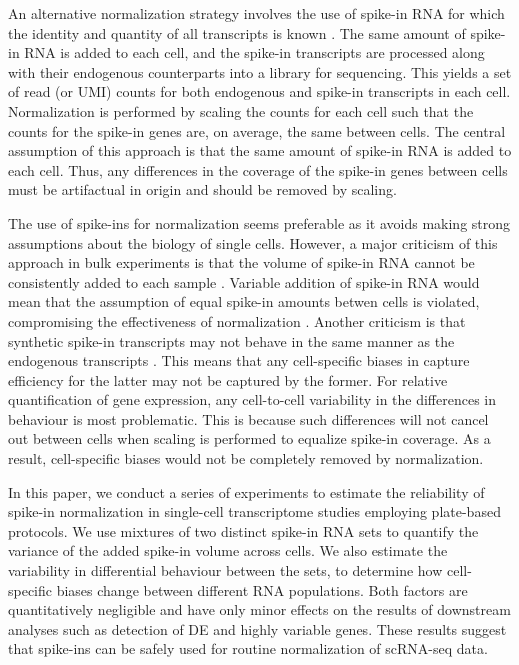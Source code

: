 \documentclass{article}
\begin{document}
An alternative normalization strategy involves the use of spike-in RNA for which the identity and quantity of all transcripts is known \cite{stegle2015computational}.
The same amount of spike-in RNA is added to each cell, and the spike-in transcripts are processed along with their endogenous counterparts into a library for sequencing.
This yields a set of read (or UMI) counts for both endogenous and spike-in transcripts in each cell.
Normalization is performed by scaling the counts for each cell such that the counts for the spike-in genes are, on average, the same between cells.
The central assumption of this approach is that the same amount of spike-in RNA is added to each cell.
Thus, any differences in the coverage of the spike-in genes between cells must be artifactual in origin and should be removed by scaling.

The use of spike-ins for normalization seems preferable as it avoids making strong assumptions about the biology of single cells.
However, a major criticism of this approach in bulk experiments is that the volume of spike-in RNA cannot be consistently added to each sample \cite{robinson2010tmm}.
Variable addition of spike-in RNA would mean that the assumption of equal spike-in amounts betwen cells is violated, compromising the effectiveness of normalization \cite{risso2014normalization}.
Another criticism is that synthetic spike-in transcripts may not behave in the same manner as the endogenous transcripts \cite{grun2015design}.
This means that any cell-specific biases in capture efficiency for the latter may not be captured by the former.
For relative quantification of gene expression, any cell-to-cell variability in the differences in behaviour is most problematic.
This is because such differences will not cancel out between cells when scaling is performed to equalize spike-in coverage.
As a result, cell-specific biases would not be completely removed by normalization.

In this paper, we conduct a series of experiments to estimate the reliability of spike-in normalization in single-cell transcriptome studies employing plate-based protocols.
We use mixtures of two distinct spike-in RNA sets to quantify the variance of the added spike-in volume across cells.
We also estimate the variability in differential behaviour between the sets, to determine how cell-specific biases change between different RNA populations.
Both factors are quantitatively negligible and have only minor effects on the results of downstream analyses such as detection of DE and highly variable genes.
These results suggest that spike-ins can be safely used for routine normalization of scRNA-seq data.
\end{document}
